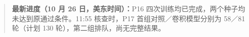 \begin{quote}\small\textbf{最新进度（10 月 26 日，美东时间）：}P16 四次训练均已完成，两个种子均未达到原通过条件。11:55 核查时，P17 首组对照／卷积模型分别为 58／81 轮（计划 130 轮），第二组排队，尚无完整结果。\end{quote}